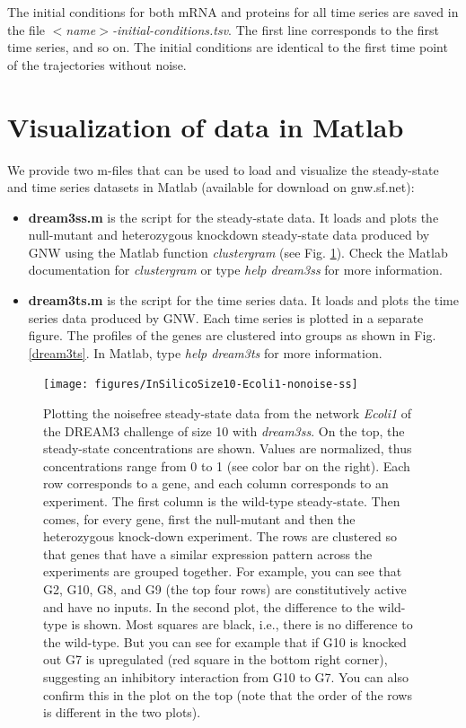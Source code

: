 \documentclass{llncs}
\newenvironment{mylist}{
\begin{itemize}
}{\end{itemize}}
\begin{document}
The initial conditions for both mRNA and proteins for all time series are saved in the file \emph{ $<$name$>$-initial-conditions.tsv}. The first line corresponds to the first time series, and so on. The initial conditions are identical to the first time point of the trajectories without noise.



\section{Visualization of data in Matlab}
\label{m-files}

We provide two m-files that can be used to load and visualize the steady-state and time series datasets in Matlab (available for download on gnw.sf.net):

\begin{mylist}
\item \textbf{dream3ss.m} is the script for the steady-state data. It loads and plots the null-mutant and heterozygous knockdown steady-state data produced by GNW using the Matlab function \emph{clustergram} (see Fig. \ref{dream3ss}). Check the Matlab documentation for \emph{clustergram} or type \emph{help dream3ss} for more information.\\

\item \textbf{dream3ts.m} is the script for the time series data. It loads and plots the time series data produced by GNW. Each time series is plotted in a separate figure. The profiles of the genes are clustered into groups as shown in Fig. \ref{dream3ts}. In Matlab, type \emph{help dream3ts} for more information.
\end{mylist}

\begin{figure}[tbh]
\label{dream3ss}
\centering\texttt{[image: figures/InSilicoSize10-Ecoli1-nonoise-ss]}
\caption{Plotting the noisefree steady-state data from the network \emph{Ecoli1} of the DREAM3 challenge of size 10 with \emph{dream3ss}. On the top, the steady-state concentrations are shown. Values are normalized, thus concentrations range from 0 to 1 (see color bar on the right). Each row corresponds to a gene, and each column corresponds to an experiment. The first column is the wild-type steady-state. Then comes, for every gene, first the null-mutant and then the heterozygous knock-down experiment. The rows are clustered so that genes that have a similar expression pattern across the experiments are grouped together. For example, you can see that G2, G10, G8, and G9 (the top four rows) are constitutively active and have no inputs.
In the second plot, the difference to the wild-type is shown. Most squares are black, i.e., there is no difference to the wild-type. But you can see for example that if G10 is knocked out G7 is upregulated (red square in the bottom right corner), suggesting an inhibitory interaction from G10 to G7. You can also confirm this in the plot on the top (note that the order of the rows is different in the two plots).}
\end{figure}
\end{document}
